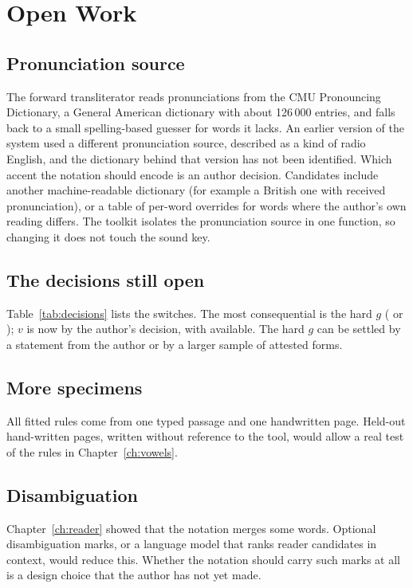 \chapter{Open Work}\label{ch:open}

\section{Pronunciation source}
The forward transliterator reads pronunciations from the CMU Pronouncing Dictionary, a General American dictionary with about 126\,000 entries, and falls back to a small spelling-based guesser for words it lacks. An earlier version of the system used a different pronunciation source, described as a kind of radio English, and the dictionary behind that version has not been identified. Which accent the notation should encode is an author decision. Candidates include another machine-readable dictionary (for example a British one with received pronunciation), or a table of per-word overrides for words where the author's own reading differs. The toolkit isolates the pronunciation source in one function, so changing it does not touch the sound key.

\section{The decisions still open}
Table~\ref{tab:decisions} lists the switches. The most consequential is the hard $g$ ( or ); $v$ is now  by the author's decision, with  available. The hard $g$ can be settled by a statement from the author or by a larger sample of attested forms.

\section{More specimens}
All fitted rules come from one typed passage and one handwritten page. Held-out hand-written pages, written without reference to the tool, would allow a real test of the rules in Chapter~\ref{ch:vowels}.

\section{Disambiguation}
Chapter~\ref{ch:reader} showed that the notation merges some words. Optional disambiguation marks, or a language model that ranks reader candidates in context, would reduce this. Whether the notation should carry such marks at all is a design choice that the author has not yet made.

